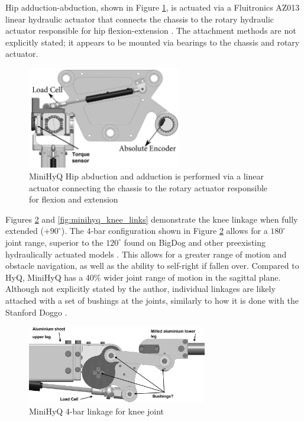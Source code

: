 Hip adduction-abduction, shown in Figure \ref{fig:minihyq_haa}, is actuated via a Fluitronics AZ013 linear hydraulic actuator that connects the chassis to the rotary hydraulic actuator responsible for hip flexion-extension \cite{khan_minihyq_2015}.
The attachment methods are not explicitly stated; it appears to be mounted via bearings to the chassis and rotary actuator.

\begin{figure}[H]
    \centering
    \includegraphics[width=0.6\textwidth]{Sections/LiteratureReview/img/minihyq/subsys_minihyq_haa.png}
    \caption{MiniHyQ Hip abduction and adduction is performed via a linear actuator connecting the chassis to the rotary actuator responsible for flexion and extension \cite{khan_minihyq_2015}}
    \label{fig:minihyq_haa}
\end{figure}

Figures \ref{fig:minihyq_knee_cad} and \ref{fig:minihyq_knee_links} demonstrate the knee linkage when fully extended ($+90^{\circ}$).
The 4-bar configuration shown in Figure \ref{fig:minihyq_knee_cad} allows for a $180^{\circ}$ joint range, superior to the $120^{\circ}$ found on BigDog and other preexisting hydraulically actuated models \cite{khan_development_2015}.
This allows for a greater range of motion and obstacle navigation, as well as the ability to self-right if fallen over. Compared to HyQ, MiniHyQ has a 40\% wider joint range of motion in the sagittal plane.
Although not explicitly stated by the author, individual linkages are likely attached with a set of bushings at the joints, similarly to how it is done with the Stanford Doggo \cite{kau_stanford_2019}.

\begin{figure}[H]
    \centering
    \includegraphics[width=0.7\textwidth]{Sections/LiteratureReview/img/minihyq/subsys_minihyq_knee_cad.png}
    \caption{MiniHyQ 4-bar linkage for knee joint \cite{khan_minihyq_2015}}
    \label{fig:minihyq_knee_cad}
\end{figure}

